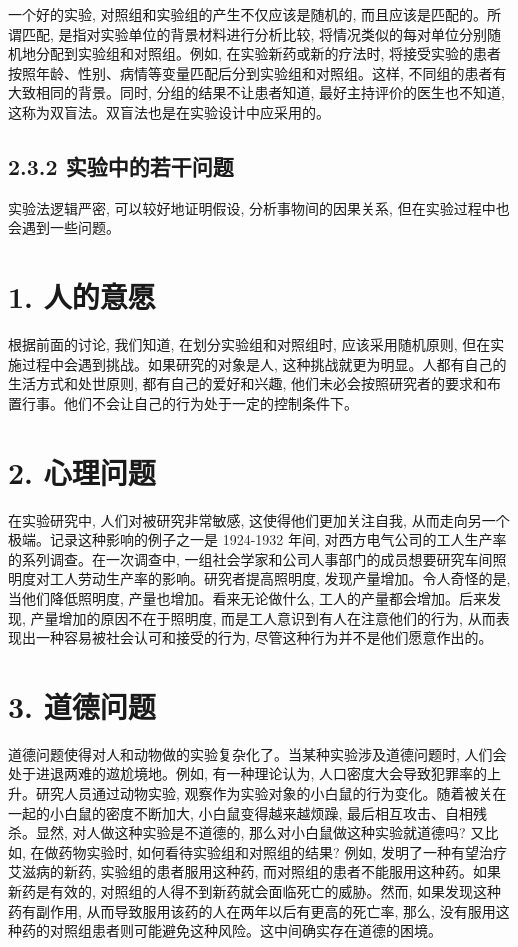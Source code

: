 \documentclass[10pt]{article}
\begin{document}
\begin{CJK*}{UTF8}{bsmi}
一个好的实验, 对照组和实验组的产生不仅应该是随机的, 而且应该是匹配的。所谓匹配, 是指对实验单位的背景材料进行分析比较, 将情况类似的每对单位分别随机地分配到实验组和对照组。例如, 在实验新药或新的疗法时, 将接受实验的患者按照年龄、性别、病情等变量匹配后分到实验组和对照组。这样, 不同组的患者有大致相同的背景。同时, 分组的结果不让患者知道, 最好主持评价的医生也不知道, 这称为双盲法。双盲法也是在实验设计中应采用的。

\subsection*{2.3.2 实验中的若干问题}
实验法逻辑严密, 可以较好地证明假设, 分析事物间的因果关系, 但在实验过程中也会遇到一些问题。

\section*{1. 人的意愿}
根据前面的讨论, 我们知道, 在划分实验组和对照组时, 应该采用随机原则, 但在实施过程中会遇到挑战。如果研究的对象是人, 这种挑战就更为明显。人都有自己的生活方式和处世原则, 都有自己的爱好和兴趣, 他们未必会按照研究者的要求和布置行事。他们不会让自己的行为处于一定的控制条件下。

\section*{2. 心理问题}
在实验研究中, 人们对被研究非常敏感, 这使得他们更加关注自我, 从而走向另一个极端。记录这种影响的例子之一是 1924-1932 年间, 对西方电气公司的工人生产率的系列调查。在一次调查中, 一组社会学家和公司人事部门的成员想要研究车间照明度对工人劳动生产率的影响。研究者提高照明度, 发现产量增加。令人奇怪的是, 当他们降低照明度, 产量也增加。看来无论做什么, 工人的产量都会增加。后来发现, 产量增加的原因不在于照明度, 而是工人意识到有人在注意他们的行为, 从而表现出一种容易被社会认可和接受的行为, 尽管这种行为并不是他们愿意作出的。

\section*{3. 道德问题}
道德问题使得对人和动物做的实验复杂化了。当某种实验涉及道德问题时, 人们会处于进退两难的䢟尬境地。例如, 有一种理论认为, 人口密度大会导致犯罪率的上升。研究人员通过动物实验, 观察作为实验对象的小白鼠的行为变化。随着被关在一起的小白鼠的密度不断加大, 小白鼠变得越来越烦躁, 最后相互攻击、自相残杀。显然, 对人做这种实验是不道德的, 那么对小白鼠做这种实验就道德吗? 又比如, 在做药物实验时, 如何看待实验组和对照组的结果? 例如, 发明了一种有望治疗艾滋病的新药, 实验组的患者服用这种药, 而对照组的患者不能服用这种药。如果新药是有效的, 对照组的人得不到新药就会面临死亡的威胁。然而, 如果发现这种药有副作用, 从而导致服用该药的人在两年以后有更高的死亡率, 那么, 没有服用这种药的对照组患者则可能避免这种风险。这中间确实存在道德的困境。


\end{CJK*}
\end{document}
